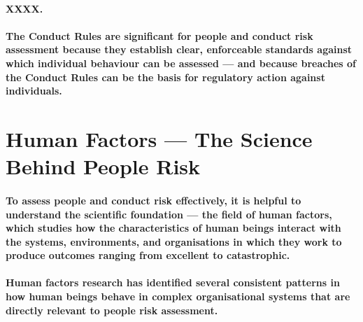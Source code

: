 \paragraph{XXXX.}
\begin{itemize}
\end{itemize}
\paragraph{The Conduct Rules are significant for people and conduct risk assessment because they establish clear, enforceable standards against which individual behaviour can be assessed — and because breaches of the Conduct Rules can be the basis for regulatory action against individuals.}

\section{Human Factors — The Science Behind People Risk}
\paragraph{To assess people and conduct risk effectively, it is helpful to understand the scientific foundation — the field of \textbf{human factors}, which studies how the characteristics of human beings interact with the systems, environments, and organisations in which they work to produce outcomes ranging from excellent to catastrophic.}
\paragraph{Human factors research has identified several consistent patterns in how human beings behave in complex organisational systems that are directly relevant to people risk assessment.}


